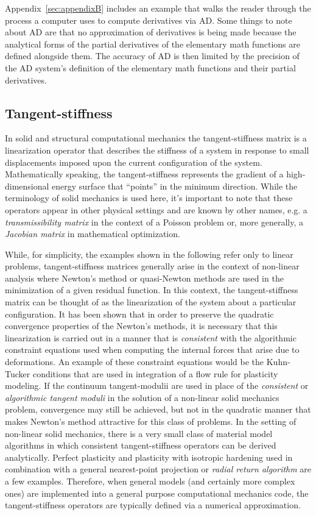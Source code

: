 \documentclass[preprint,12pt]{elsarticle}
\begin{document}
Appendix~\ref{sec:appendixB} includes an example that walks the reader through the process a computer uses to compute derivatives via AD.  Some things to note about AD are that no approximation of derivatives is being made because the analytical forms of the partial derivatives of the elementary math functions are defined alongside them. The accuracy of AD is then limited by the precision of the AD system's definition of the elementary math functions and their partial derivatives.
 
\subsection{Tangent-stiffness} 
\label{subsec:TS}

In solid and structural computational mechanics the tangent-stiffness matrix is a linearization operator that describes the stiffness of a system in response to small displacements imposed upon the current configuration of the system.  Mathematically speaking, the tangent-stiffness represents the gradient of a high-dimensional energy surface that ``points'' in the minimum direction. While the terminology of solid mechanics is used here, it's important to note that
these operators appear in other physical settings and are known by other names, e.g. a \emph{transmissibility matrix} in the context of a Poisson problem or, more generally, a \emph{Jacobian matrix} in mathematical optimization.

While, for simplicity, the examples shown in the following refer only to linear problems, tangent-stiffness matrices generally arise in the context of non-linear analysis where Newton's method or quasi-Newton methods are used in the minimization of a given residual function.  In this context, the tangent-stiffness matrix can be thought of as the linearization of the system
about a particular configuration.  It has been shown \cite{hughes1978consistent,hughes1978unconditionally} that in order to preserve the quadratic convergence properties of the Newton's methods, it is necessary that this linearization is carried out in a manner that is \emph{consistent} with the algorithmic constraint equations used when computing the internal forces that arise due to deformations.  An example of these constraint equations would be the Kuhn-Tucker conditions \cite{simo1998} that are used in integration of a flow rule for plasticity modeling.  If the continuum tangent-modulii are used in place of the \emph{consistent} or \emph{algorithmic tangent moduli} in the solution of a non-linear solid mechanics problem, convergence may still be achieved, but not in the quadratic manner that makes Newton's method attractive for this class of problems.  In the setting of non-linear solid mechanics, there is a very small class of material model algorithms in which consistent tangent-stiffness operators can be derived analytically.  Perfect plasticity and plasticity with isotropic hardening used in combination with a general nearest-point projection or \emph{radial return algorithm} are a few examples.  Therefore, when general models (and certainly more complex ones) are implemented into a general purpose computational mechanics code, the tangent-stiffness operators are typically defined via a numerical approximation.  
\end{document}
